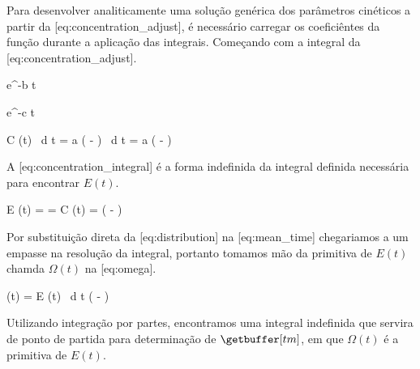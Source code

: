 \startchapter[title=Desenvolvimento]
    Para desenvolver analiticamente uma solução genérica dos parâmetros cinéticos a partir da [eq:concentration_adjust], é necessário carregar os coeficiêntes da função durante a aplicação das integrais. Começando com a integral da [eq:concentration_adjust].
    
    \startbuffer[b]
        e^{-b t}
    \stopbuffer

    \startbuffer[c]
        e^{-c t}
    \stopbuffer

    \startbuffer[k]
    \stopbuffer

    \startbuffer[ki]
    \stopbuffer

    \startplaceformula[reference=eq:concentration_integral]
        \startformula
            \startequationsystem[align=2:left]
                \NC \int C (t) \, d t \NC = \int a \left( \getbuffer[b] - \getbuffer[c] \right) \, d t \NR
                \NC \NC = a \left(  -  \right) \NR
            \stopequationsystem
        \stopformula
    \stopplaceformula

    A [eq:concentration_integral] é a forma indefinida da integral definida necessária para encontrar $E (t)$.

    \startplaceformula[reference=eq:distribution]
        \startformula
            \startequationsystem[align=2:left]
                \NC E (t) \NC =  \NR
                \NC \NC =  C (t) \NR
                \NC \NC = \getbuffer[k] \left( \getbuffer[b] - \getbuffer[c] \right) \NR
            \stopequationsystem
        \stopformula
    \stopplaceformula

    Por substituição direta da [eq:distribution] na [eq:mean_time] chegariamos a um empasse na resolução da integral, portanto tomamos mão da primitiva de $E (t)$ chamda $\Omega (t)$ na [eq:omega].

    \startplaceformula[reference=eq:omega]
        \startformula
            \startequationsystem[align=2:left]
                \NC \Omega (t) \NC = \int E (t) \, d t \NR
                \NC \NC \getbuffer[k] \left(  -  \right) \NR
            \stopequationsystem
        \stopformula
    \stopplaceformula

    Utilizando integração por partes, encontramos uma integral indefinida que servira de ponto de partida para determinação de $\getbuffer[tm]$, em que $\Omega (t)$ é a primitiva de $E (t)$.

